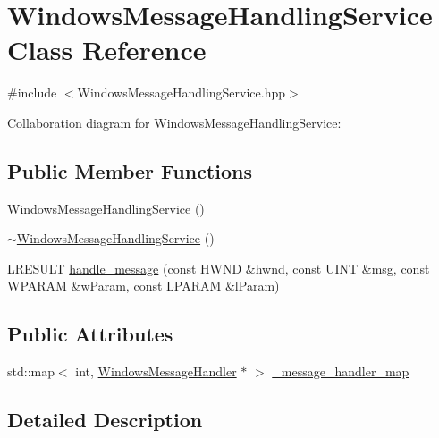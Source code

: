 \hypertarget{class_windows_message_handling_service}{}\section{Windows\+Message\+Handling\+Service Class Reference}
\label{class_windows_message_handling_service}


{\ttfamily \#include $<$Windows\+Message\+Handling\+Service.\+hpp$>$}



Collaboration diagram for Windows\+Message\+Handling\+Service\+:
\subsection*{Public Member Functions}
\begin{DoxyCompactItemize}
\item 
\hyperlink{class_windows_message_handling_service_ab5169289e763ed22a54c7a29563ed7bb_ab5169289e763ed22a54c7a29563ed7bb}{Windows\+Message\+Handling\+Service} ()
\item 
\hyperlink{class_windows_message_handling_service_a64c5fd2c53b8ae119d555a0ef7b53fd9_a64c5fd2c53b8ae119d555a0ef7b53fd9}{$\sim$\+Windows\+Message\+Handling\+Service} ()
\item 
L\+R\+E\+S\+U\+LT \hyperlink{class_windows_message_handling_service_a9c7224471322c4e364c440b35321d253_a9c7224471322c4e364c440b35321d253}{handle\+\_\+message} (const H\+W\+ND \&hwnd, const U\+I\+NT \&msg, const W\+P\+A\+R\+AM \&w\+Param, const L\+P\+A\+R\+AM \&l\+Param)
\end{DoxyCompactItemize}
\subsection*{Public Attributes}
\begin{DoxyCompactItemize}
\item 
std\+::map$<$ int, \hyperlink{class_windows_message_handler}{Windows\+Message\+Handler} $\ast$ $>$ \hyperlink{class_windows_message_handling_service_a3b880b8e67754a08a10fa7db150d11f5_a3b880b8e67754a08a10fa7db150d11f5}{\+\_\+message\+\_\+handler\+\_\+map}
\end{DoxyCompactItemize}


\subsection{Detailed Description}


